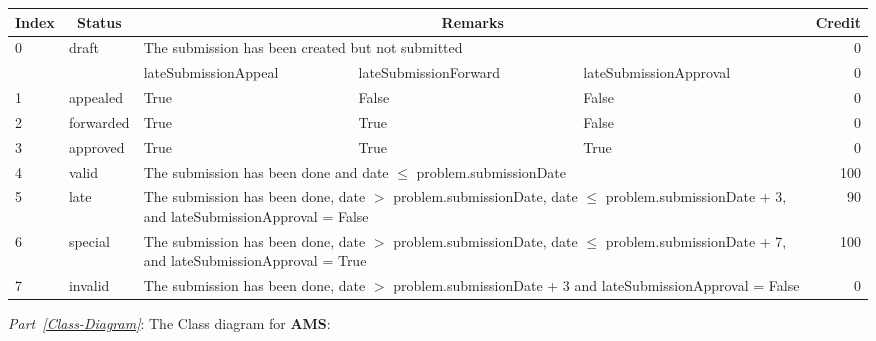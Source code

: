\documentclass{article}
\begin{document}
\begin{enumerate}
\begin{center}
\begin{scriptsize}
\begin{tabular}{|l|l|l|l|l|r|} \hline
\multicolumn{1}{|c}{\bf Index} & \multicolumn{1}{|c}{\bf Status} & \multicolumn{3}{|c}{\bf Remarks} & \multicolumn{1}{|c|}{\bf Credit} \\ \hline
0 & draft 		& \multicolumn{3}{|p{8.5cm}|}{The submission has been created but not submitted} & 0 \\ \cline{3-5}
  &  			& \textsf{lateSubmissionAppeal} & \textsf{lateSubmissionForward} & \textsf{lateSubmissionApproval} & 0 \\ \cline{3-5}
1 & appealed	& True							& False							 & False & 0 \\ \cline{3-5}
2 & forwarded	& True							& True							 & False & 0 \\ \cline{3-5}
3 & approved	& True							& True							 & True & 0 \\ \cline{3-5}
4 & valid	 	& \multicolumn{3}{|p{8.5cm}|}{The submission has been done and \textsf{date} $\leq$ \textsf{problem.submissionDate}} & 100 \\
5 & late	 	& \multicolumn{3}{|p{8.5cm}|}{The submission has been done, \textsf{date} $>$ \textsf{problem.submissionDate}, \textsf{date} $\leq$ \textsf{problem.submissionDate} + 3, and \textsf{lateSubmissionApproval} = False} & 90 \\
6 & special		& \multicolumn{3}{|p{8.5cm}|}{The submission has been done, \textsf{date} $>$ \textsf{problem.submissionDate}, \textsf{date} $\leq$ \textsf{problem.submissionDate} + 7, and \textsf{lateSubmissionApproval} = True} & 100 \\ 
7 & invalid		& \multicolumn{3}{|p{8.5cm}|}{The submission has been done, \textsf{date} $>$ \textsf{problem.submissionDate} + 3 and \textsf{lateSubmissionApproval} = False} & 0 \\ \hline
\end{tabular}
\end{scriptsize}
\end{center}

{\em Part~\ref{Class-Diagram}}: The Class diagram for {\bf AMS}:
\begin{center}
\begin{tabular}{|l|} \hline
\\ \hline
\end{tabular}
\end{center}


\end{enumerate}
\end{document}
